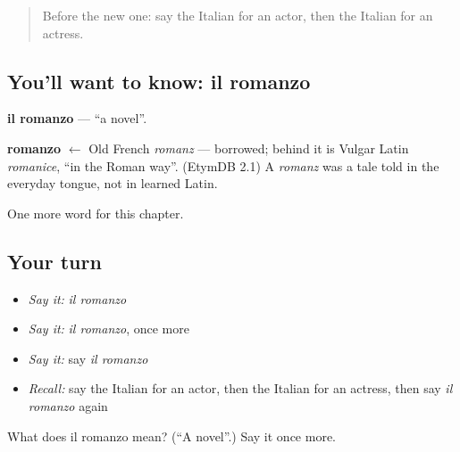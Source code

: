 \label{lesson:IT-C194-romanzo}



\begin{quote}
Before the new one: say the Italian for an actor, then the Italian for an actress.
\end{quote}

\subsection*{You'll want to know: il romanzo}
\textbf{il romanzo} — \textquotedblleft{}a novel\textquotedblright{}.

\begin{cousinweb}
\textbf{romanzo} $\leftarrow$ Old French \emph{romanz} — borrowed; behind it is Vulgar Latin \emph{romanice}, \textquotedblleft{}in the Roman way\textquotedblright{}. (EtymDB 2.1) A \emph{romanz} was a tale told in the everyday tongue, not in learned Latin.
\end{cousinweb}

\begin{grammarlens}[title={What you've built}]
One more word for this chapter.
\end{grammarlens}

\subsection*{Your turn}
\begin{itemize}
\raggedright
  \item \emph{Say it:} \emph{il romanzo}
  \item \emph{Say it:} \emph{il romanzo}, once more
  \item \emph{Say it:} say \emph{il romanzo}
  \item \emph{Recall:} say the Italian for an actor, then the Italian for an actress, then say \emph{il romanzo} again
\end{itemize}

\begin{tcolorbox}[breakable,colback=teal!4,colframe=teal!35!black,title={Before you move on}]
What does il romanzo mean? (\textquotedblleft{}A novel\textquotedblright{}.) Say it once more.
\end{tcolorbox}

